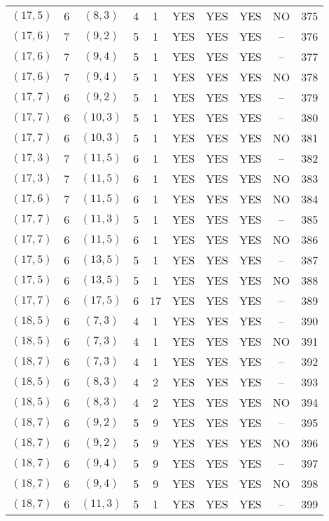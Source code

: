 \begin{longtable}{|c|c|c|c|c|c|c|c|c|c|}
$(17, 5)$ & 6 & $(8, 3)$ & 4 & 1 & YES & YES & YES & NO & 375\\
$(17, 6)$ & 7 & $(9, 2)$ & 5 & 1 & YES & YES & YES & -- & 376\\
$(17, 6)$ & 7 & $(9, 4)$ & 5 & 1 & YES & YES & YES & -- & 377\\
$(17, 6)$ & 7 & $(9, 4)$ & 5 & 1 & YES & YES & YES & NO & 378\\
$(17, 7)$ & 6 & $(9, 2)$ & 5 & 1 & YES & YES & YES & -- & 379\\
$(17, 7)$ & 6 & $(10, 3)$ & 5 & 1 & YES & YES & YES & -- & 380\\
$(17, 7)$ & 6 & $(10, 3)$ & 5 & 1 & YES & YES & YES & NO & 381\\
$(17, 3)$ & 7 & $(11, 5)$ & 6 & 1 & YES & YES & YES & -- & 382\\
$(17, 3)$ & 7 & $(11, 5)$ & 6 & 1 & YES & YES & YES & NO & 383\\
$(17, 6)$ & 7 & $(11, 5)$ & 6 & 1 & YES & YES & YES & NO & 384\\
$(17, 7)$ & 6 & $(11, 3)$ & 5 & 1 & YES & YES & YES & -- & 385\\
$(17, 7)$ & 6 & $(11, 5)$ & 6 & 1 & YES & YES & YES & NO & 386\\
$(17, 5)$ & 6 & $(13, 5)$ & 5 & 1 & YES & YES & YES & -- & 387\\
$(17, 5)$ & 6 & $(13, 5)$ & 5 & 1 & YES & YES & YES & NO & 388\\
$(17, 7)$ & 6 & $(17, 5)$ & 6 & 17 & YES & YES & YES & -- & 389\\
$(18, 5)$ & 6 & $(7, 3)$ & 4 & 1 & YES & YES & YES & -- & 390\\
$(18, 5)$ & 6 & $(7, 3)$ & 4 & 1 & YES & YES & YES & NO & 391\\
$(18, 7)$ & 6 & $(7, 3)$ & 4 & 1 & YES & YES & YES & -- & 392\\
$(18, 5)$ & 6 & $(8, 3)$ & 4 & 2 & YES & YES & YES & -- & 393\\
$(18, 5)$ & 6 & $(8, 3)$ & 4 & 2 & YES & YES & YES & NO & 394\\
$(18, 7)$ & 6 & $(9, 2)$ & 5 & 9 & YES & YES & YES & -- & 395\\
$(18, 7)$ & 6 & $(9, 2)$ & 5 & 9 & YES & YES & YES & NO & 396\\
$(18, 7)$ & 6 & $(9, 4)$ & 5 & 9 & YES & YES & YES & -- & 397\\
$(18, 7)$ & 6 & $(9, 4)$ & 5 & 9 & YES & YES & YES & NO & 398\\
$(18, 7)$ & 6 & $(11, 3)$ & 5 & 1 & YES & YES & YES & -- & 399\\

\end{longtable}

